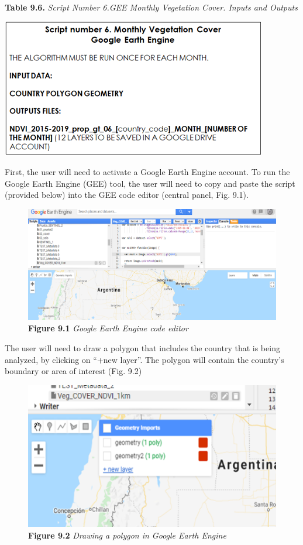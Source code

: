 \documentclass[
  10pt,
  b5paper,
]{book}
\begin{document}
\textbf{Table 9.6.} \emph{Script Number 6.GEE Monthly Vegetation Cover. Inputs and Outputs}

\includegraphics{tables/Table_9.5.png}

First, the user will need to activate a Google Earth Engine account. To run the Google Earth Engine (GEE) tool, the user will need to copy and paste the script (provided below) into the GEE code editor (central panel, Fig. 9.1).

\begin{figure}
\centering
\includegraphics{images/Figure_9.1.png}
\caption{\textbf{Figure 9.1} \emph{Google Earth Engine code editor}}
\end{figure}

The user will need to draw a polygon that includes the country that is being analyzed, by clicking on ``+new layer''. The polygon will contain the country's boundary or area of interest (Fig. 9.2)

\begin{figure}
\centering
\includegraphics{images/Figure_9.2.png}
\caption{\textbf{Figure 9.2} \emph{Drawing a polygon in Google Earth Engine}}
\end{figure}
\end{document}
